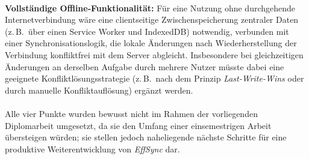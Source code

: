 \paragraph{}
\textbf{Vollständige Offline-Funktionalität:} Für eine Nutzung ohne durchgehende Internetverbindung wäre eine clientseitige Zwischenspeicherung zentraler Daten (z.\,B.\ über einen Service Worker und IndexedDB) notwendig, verbunden mit einer Synchronisationslogik, die lokale Änderungen nach Wiederherstellung der Verbindung konfliktfrei mit dem Server abgleicht. Insbesondere bei gleichzeitigen Änderungen an derselben Aufgabe durch mehrere Nutzer müsste dabei eine geeignete Konfliktlösungsstrategie (z.\,B.\ nach dem Prinzip \textit{Last-Write-Wins} oder durch manuelle Konfliktauflösung) ergänzt werden.

\paragraph{}
Alle vier Punkte wurden bewusst nicht im Rahmen der vorliegenden Diplomarbeit umgesetzt, da sie den Umfang einer einsemestrigen Arbeit übersteigen würden; sie stellen jedoch naheliegende nächste Schritte für eine produktive Weiterentwicklung von \textit{EffSync} dar.